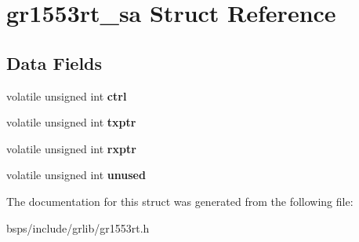 \hypertarget{structgr1553rt__sa}{}\section{gr1553rt\+\_\+sa Struct Reference}
\label{structgr1553rt__sa}
\subsection*{Data Fields}
\begin{DoxyCompactItemize}
\item 
\mbox{\label{structgr1553rt__sa_a39ca9c66b6154af8663106624a49fa7e}} 
volatile unsigned int {\bfseries ctrl}
\item 
\mbox{\label{structgr1553rt__sa_a42170c4eb675bc40f01eca5b22541a74}} 
volatile unsigned int {\bfseries txptr}
\item 
\mbox{\label{structgr1553rt__sa_a69a473de83125a623c768cf0e047fd06}} 
volatile unsigned int {\bfseries rxptr}
\item 
\mbox{\label{structgr1553rt__sa_ad2df2a7e06a1fe8186aac401071a3f55}} 
volatile unsigned int {\bfseries unused}
\end{DoxyCompactItemize}


The documentation for this struct was generated from the following file\+:\begin{DoxyCompactItemize}
\item 
bsps/include/grlib/gr1553rt.\+h\end{DoxyCompactItemize}
